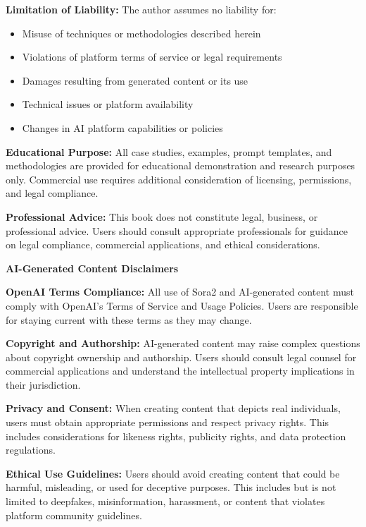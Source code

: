 \documentclass[11pt,letterpaper]{book}
\begin{document}
\textbf{Limitation of Liability:} The author assumes no liability for:
\begin{itemize}
\item Misuse of techniques or methodologies described herein
\item Violations of platform terms of service or legal requirements
\item Damages resulting from generated content or its use
\item Technical issues or platform availability
\item Changes in AI platform capabilities or policies
\end{itemize}

\textbf{Educational Purpose:} All case studies, examples, prompt templates, and methodologies are provided for educational demonstration and research purposes only. Commercial use requires additional consideration of licensing, permissions, and legal compliance.

\textbf{Professional Advice:} This book does not constitute legal, business, or professional advice. Users should consult appropriate professionals for guidance on legal compliance, commercial applications, and ethical considerations.

\vspace{0.5cm}

\textbf{AI-Generated Content Disclaimers}

\textbf{OpenAI Terms Compliance:} All use of Sora2 and AI-generated content must comply with OpenAI's Terms of Service and Usage Policies. Users are responsible for staying current with these terms as they may change.

\textbf{Copyright and Authorship:} AI-generated content may raise complex questions about copyright ownership and authorship. Users should consult legal counsel for commercial applications and understand the intellectual property implications in their jurisdiction.

\textbf{Privacy and Consent:} When creating content that depicts real individuals, users must obtain appropriate permissions and respect privacy rights. This includes considerations for likeness rights, publicity rights, and data protection regulations.

\textbf{Ethical Use Guidelines:} Users should avoid creating content that could be harmful, misleading, or used for deceptive purposes. This includes but is not limited to deepfakes, misinformation, harassment, or content that violates platform community guidelines.
\end{document}
